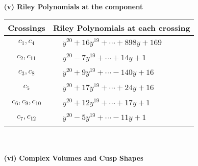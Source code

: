 \documentclass[1p]{elsarticle_modified}
\theoremstyle{definition}
\begin{document}
\newpage\renewcommand{\arraystretch}{1}
\flushleft \textbf{(v) Riley Polynomials at the component}\newline \\
\begin{tabular}{m{50pt}|m{274pt}}
Crossings & \hspace{64pt}Riley Polynomials at each crossing \\
\hline $$\begin{aligned}c_{1},c_{4}\end{aligned}$$&$\begin{aligned}
&y^{20}+16 y^{19}+\cdots+898 y+169
\end{aligned}$\\
\hline $$\begin{aligned}c_{2},c_{11}\end{aligned}$$&$\begin{aligned}
&y^{20}-7 y^{19}+\cdots+14 y+1
\end{aligned}$\\
\hline $$\begin{aligned}c_{3},c_{8}\end{aligned}$$&$\begin{aligned}
&y^{20}+9 y^{19}+\cdots-140 y+16
\end{aligned}$\\
\hline $$\begin{aligned}c_{5}\end{aligned}$$&$\begin{aligned}
&y^{20}+17 y^{19}+\cdots+24 y+16
\end{aligned}$\\
\hline $$\begin{aligned}c_{6},c_{9},c_{10}\end{aligned}$$&$\begin{aligned}
&y^{20}+12 y^{19}+\cdots+17 y+1
\end{aligned}$\\
\hline $$\begin{aligned}c_{7},c_{12}\end{aligned}$$&$\begin{aligned}
&y^{20}-5 y^{19}+\cdots-11 y+1
\end{aligned}$\\
\hline
\end{tabular}\\~\\
\newpage\flushleft \textbf{(vi) Complex Volumes and Cusp Shapes}
\end{document}
